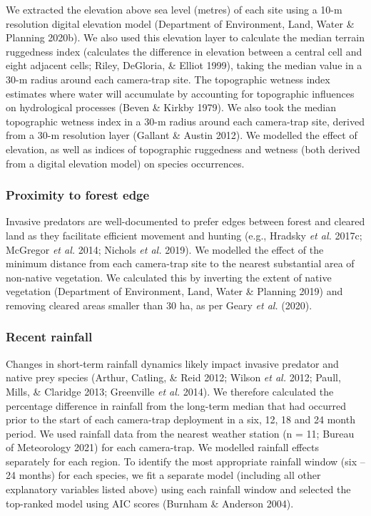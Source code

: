 \documentclass[11pt,a4paper,titlepage,twoside,openright]{style/unimelbthesis}
\begin{document}
\begin{mainmatter}
We extracted the elevation above sea level (metres) of each site using a 10-m resolution digital elevation model (Department of Environment, Land, Water \& Planning 2020b). We also used this elevation layer to calculate the median terrain ruggedness index (calculates the difference in elevation between a central cell and eight adjacent cells; Riley, DeGloria, \& Elliot 1999), taking the median value in a 30-m radius around each camera-trap site. The topographic wetness index estimates where water will accumulate by accounting for topographic influences on hydrological processes (Beven \& Kirkby 1979). We also took the median topographic wetness index in a 30-m radius around each camera-trap site, derived from a 30-m resolution layer (Gallant \& Austin 2012). We modelled the effect of elevation, as well as indices of topographic ruggedness and wetness (both derived from a digital elevation model) on species occurrences.

\hypertarget{proximity-to-forest-edge}{%
\subsubsection{Proximity to forest edge}\label{proximity-to-forest-edge}}

Invasive predators are well-documented to prefer edges between forest and cleared land as they facilitate efficient movement and hunting (e.g., Hradsky \emph{et al.} 2017c; McGregor \emph{et al.} 2014; Nichols \emph{et al.} 2019). We modelled the effect of the minimum distance from each camera-trap site to the nearest substantial area of non-native vegetation. We calculated this by inverting the extent of native vegetation (Department of Environment, Land, Water \& Planning 2019) and removing cleared areas smaller than 30 ha, as per Geary \emph{et al.} (2020).

\hypertarget{recent-rainfall}{%
\subsubsection{Recent rainfall}\label{recent-rainfall}}

Changes in short-term rainfall dynamics likely impact invasive predator and native prey species (Arthur, Catling, \& Reid 2012; Wilson \emph{et al.} 2012; Paull, Mills, \& Claridge 2013; Greenville \emph{et al.} 2014). We therefore calculated the percentage difference in rainfall from the long-term median that had occurred prior to the start of each camera-trap deployment in a six, 12, 18 and 24 month period. We used rainfall data from the nearest weather station (n = 11; Bureau of Meteorology 2021) for each camera-trap. We modelled rainfall effects separately for each region. To identify the most appropriate rainfall window (six -- 24 months) for each species, we fit a separate model (including all other explanatory variables listed above) using each rainfall window and selected the top-ranked model using AIC scores (Burnham \& Anderson 2004).


\end{mainmatter}
\end{document}
